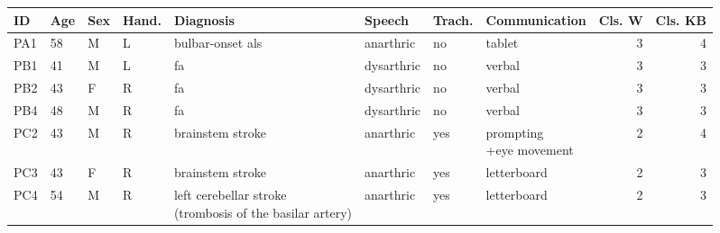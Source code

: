 
\begin{tabular}{llllllllrr}
  \toprule
  \textbf{ID}  & \textbf{Age} & \textbf{Sex} & \textbf{Hand.} &
  \textbf{Diagnosis} & \textbf{Speech} & \textbf{Trach.} & \textbf{Communication} &
  \textbf{Cls. W} & \textbf{Cls. KB} \\ \midrule
  PA1 & 58  & M   & L     & bulbar-onset \acs{als} & anarthric  & no          & tablet                 & 3  & 4 \\
  PB1 & 41  & M   & L     & \acs{fa} & dysarthric & no          & verbal                 & 3  & 3 \\
  PB2 & 43  & F   & R     & \acs{fa} & dysarthric & no          & verbal                 & 3  & 3 \\
  PB4 & 48  & M   & R     & \acs{fa} & dysarthric & no          & verbal                 & 3  & 3 \\
  PC2 & 43  & M   & R     & brainstem stroke & anarthric  & yes         &  \makecell[l]{prompting\\+eye movement} & 2 & 4  \\
  PC3 & 43  & F   & R     & brainstem stroke & anarthric  & yes         & letterboard            & 2 & 3 \\
  PC4 & 54  & M   & R     & \makecell[l]{left cerebellar stroke \\ (trombosis of the basilar artery)} & anarthric  & yes & letterboard & 2 & 3 \\
  \bottomrule
\end{tabular}
